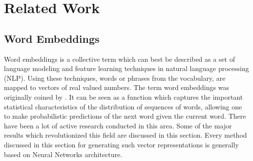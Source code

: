 \chapter{Related Work}
\label{cha:relwork}
\section{Word Embeddings}
Word embeddings is a collective term which can best be described as a set of language modeling and feature learning techniques in natural language processing (NLP). Using these techniques, words or phrases from the vocabulary, are mapped to vectors of real valued numbers. 
The term word embeddings was originally coined by \cite{bengio2003neural}. It can be seen as a function which captures the important statistical characteristics of the distribution of sequences of words, allowing one to make probabilistic predictions of the next word given the current word. There have been a lot of active research conducted in this area. Some of the major results which revolutionized this field are discussed in this section. Every method discussed in this section for generating such vector representations is generally based on Neural Networks architecture.  
